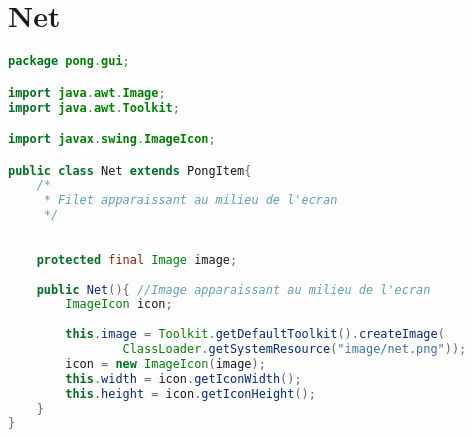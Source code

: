 \section{Net}
\begin{lstlisting}[language=Java]
package pong.gui;

import java.awt.Image;
import java.awt.Toolkit;

import javax.swing.ImageIcon;

public class Net extends PongItem{
	/*
	 * Filet apparaissant au milieu de l'ecran
	 */
	
	
	protected final Image image;
	
	public Net(){ //Image apparaissant au milieu de l'ecran 
		ImageIcon icon;
		
		this.image = Toolkit.getDefaultToolkit().createImage(
				ClassLoader.getSystemResource("image/net.png"));
		icon = new ImageIcon(image);
		this.width = icon.getIconWidth();
		this.height = icon.getIconHeight();
	}
}

\end{lstlisting}